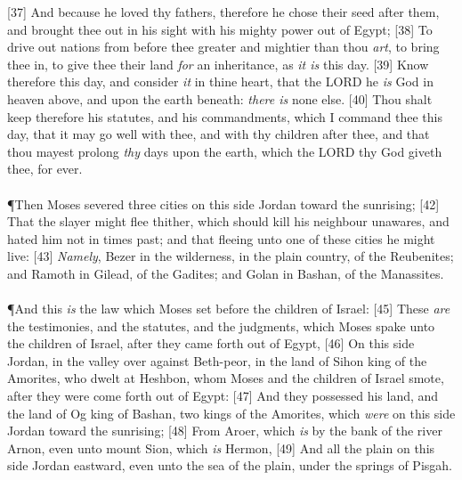 [37] \textcolor[rgb]{0.00,0.00,1.00}{And because he loved thy fathers, therefore he chose their seed after them, and brought thee out in his sight with his mighty power out of Egypt;}
[38] \textcolor[rgb]{0.00,0.00,1.00}{To drive out nations from before thee greater and mightier than thou \emph{art}, to bring thee in, to give thee their land \emph{for} an inheritance, as \emph{it is} this day.}
[39] \textcolor[rgb]{0.00,0.00,1.00}{Know therefore this day, and consider \emph{it} in thine heart, that the LORD he \emph{is} God in heaven above, and upon the earth beneath: \emph{there is} none else.}
[40] \textcolor[rgb]{0.00,0.00,1.00}{Thou shalt keep therefore his statutes, and his commandments, which I command thee this day, that it may go well with thee, and with thy children after thee, and that thou mayest prolong \emph{thy} days upon the earth, which the LORD thy God giveth thee, for ever.}\\
\\
\P \textcolor[rgb]{0.00,0.00,1.00}{Then Moses severed three cities on this side Jordan toward the sunrising;}
[42] \textcolor[rgb]{0.00,0.00,1.00}{That the slayer might flee thither, which should kill his neighbour unawares, and hated him not in times past; and that fleeing unto one of these cities he might live:}
[43] \textcolor[rgb]{0.00,0.00,1.00}{\emph{Namely}, Bezer in the wilderness, in the plain country, of the Reubenites; and Ramoth in Gilead, of the Gadites; and Golan in Bashan, of the Manassites.}\\
\\
\P \textcolor[rgb]{0.00,0.00,1.00}{And this \emph{is} the law which Moses set before the children of Israel:}
[45] \textcolor[rgb]{0.00,0.00,1.00}{These \emph{are} the testimonies, and the statutes, and the judgments, which Moses spake unto the children of Israel, after they came forth out of Egypt,}
[46] \textcolor[rgb]{0.00,0.00,1.00}{On this side Jordan, in the valley over against Beth-peor, in the land of Sihon king of the Amorites, who dwelt at Heshbon, whom Moses and the children of Israel smote, after they were come forth out of Egypt:}
[47] \textcolor[rgb]{0.00,0.00,1.00}{And they possessed his land, and the land of Og king of Bashan, two kings of the Amorites, which \emph{were} on this side Jordan toward the sunrising;}
[48] \textcolor[rgb]{0.00,0.00,1.00}{From Aroer, which \emph{is} by the bank of the river Arnon, even unto mount Sion, which \emph{is} Hermon,}
[49] \textcolor[rgb]{0.00,0.00,1.00}{And all the plain on this side Jordan eastward, even unto the sea of the plain, under the springs of Pisgah.}
\newpage
